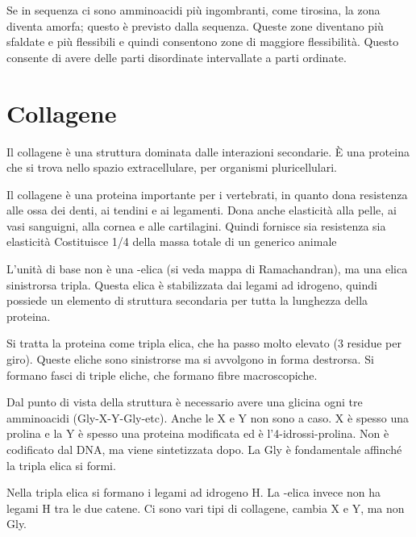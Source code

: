 
Se in sequenza ci sono amminoacidi più ingombranti, come tirosina, la
zona diventa amorfa; questo è previsto dalla sequenza. Queste zone diventano
più sfaldate e più flessibili e quindi consentono zone di maggiore
flessibilità. Questo consente di avere delle parti disordinate
intervallate a parti ordinate.

\clearpage

\section{Collagene}

Il collagene è una struttura dominata dalle interazioni secondarie. È una proteina che si
trova nello spazio extracellulare, per organismi pluricellulari.

Il collagene è una proteina importante per i vertebrati, in quanto dona resistenza alle ossa dei denti,
ai tendini e ai legamenti. Dona anche elasticità alla pelle, ai vasi sanguigni, alla cornea e
alle cartilagini. Quindi fornisce sia resistenza sia elasticità
Costituisce 1/4 della massa totale di un generico animale

L'unità di base non è una \alpha-elica (si veda mappa di Ramachandran), ma una elica sinistrorsa tripla.
Questa elica è stabilizzata dai legami ad idrogeno, quindi possiede un elemento di
struttura secondaria per tutta la lunghezza della proteina.

Si tratta la proteina come tripla elica, che ha passo molto elevato (3 residue
per giro). Queste eliche sono sinistrorse ma si avvolgono in forma destrorsa.
Si formano fasci di triple eliche, che formano fibre macroscopiche.

\begingroup{} \endgroup

Dal punto di vista della struttura è necessario avere una glicina ogni
tre amminoacidi (Gly-X-Y-Gly-etc). Anche le X e Y non sono a caso. X è
spesso una prolina e la Y è spesso una proteina modificata ed è
l'4-idrossi-prolina. Non è codificato dal DNA, ma viene sintetizzata
dopo.
La Gly è fondamentale affinché la tripla elica si formi.


Nella tripla elica si formano i legami ad idrogeno H. La \alpha-elica invece non ha
legami H tra le due catene.
Ci sono vari tipi di collagene, cambia X e Y, ma non Gly.

